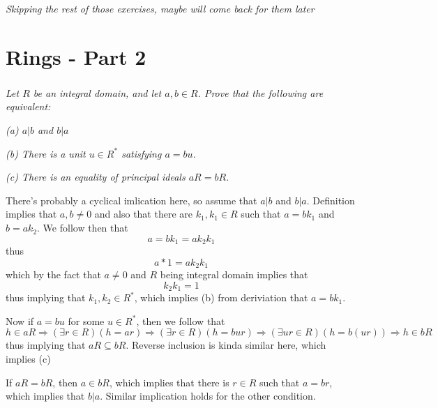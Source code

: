 \documentclass[11pt,oneside,titlepage]{book}
\DeclareMathOperator \ra {\Rightarrow}
\begin{document}
\textit{Skipping the rest of those exercises, maybe will come back for
  them later}

\chapter{Rings - Part 2}

\subsection{}

\textit{Let $R$ be an integral domain, and let $a, b \in R$. Prove
  that the following are equivalent:}

\textit{(a) $a | b$ and $b | a$ }

\textit{(b) There is a unit $u \in R^*$ satisfying $a = bu$. }

\textit{(c) There is an equality of principal ideals $aR = bR$.}

There's probably a cyclical imlication here, so assume that $a | b$ and $b | a$.
Definition implies that $a, b \neq 0$ and also that there are $k_1,
k_1 \in R$ such that $a = bk_1$ and $b = a k_2$. We follow then that
$$a = bk_1 = a k_2 k_1$$
thus
$$a * 1 = a k_2 k_1$$
which by the fact that $a \neq 0$ and $R$ being integral domain implies that
$$k_2 k_1 = 1$$
thus implying that $k_1, k_2 \in R^*$, which implies (b) from deriviation that
$a = bk_1$.

Now if $a = bu$ for some $u \in R^*$, then we follow that
$$h \in aR \ra (\exists r \in R)( h = ar) \ra
(\exists r \in R)( h = bur) \ra  (\exists ur \in R)( h = b(ur)) \ra h \in bR$$
thus implying that $aR \subseteq bR$. Reverse inclusion is kinda similar here,
which implies (c)

If $aR = bR$, then $a \in bR$, which implies that there is $r \in R$ such
that $a = br$, which implies that $b | a$. Similar implication holds
for the other condition.
\end{document}
